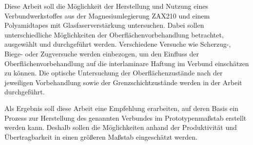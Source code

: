Diese Arbeit soll die Möglichkeit der Herstellung und Nutzung eines Verbundwerkstoffes aus der Magnesiumlegierung ZAX210 und einem Polyamidtapes mit Glasfaserverstärkung untersuchen. Dabei sollen unterschiedliche Möglichkeiten der Oberflächenvorbehandlung betrachtet, ausgewählt und durchgeführt werden. Verschiedene Versuche wie Scherzug-, Biege- oder Zugversuche werden einbezogen, um den Einfluss der Oberflächenvorbehandlung auf die interlaminare Haftung im Verbund einschätzen zu können. Die optische Untersuchung der Oberflächenzustände nach der jeweiligen Vorbehandlung sowie der Grenzschichtzustände werden in der Arbeit durchgeführt.

Als Ergebnis soll diese Arbeit eine Empfehlung erarbeiten, auf deren Basis ein Prozess zur Herstellung des genannten Verbundes im Prototypenmaßstab erstellt werden kann. Deshalb sollen die Möglichkeiten anhand der Produktivität und Übertragbarkeit in einen größeren Maßstab eingeschätzt werden.



%
